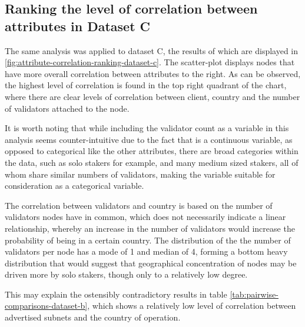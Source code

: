 \documentclass[conference]{IEEEtran}
\begin{document}
\subsection{Ranking the level of correlation between attributes in Dataset C}

The same analysis was applied to dataset C, the results of which are displayed in \ref{fig:attribute-correlation-ranking-dataset-c}.  The scatter-plot displays nodes that have more overall correlation between attributes to the right.  As can be observed, the highest level of correlation is found in the top right quadrant of the chart, where there are clear levels of correlation between client, country and the number of validators attached to the node. %

It is worth noting that while including the validator count as a variable in this analysis seems counter-intuitive due to the fact that is a continuous variable, as opposed to categorical like the other attributes, there are broad categories within the data, such as solo stakers for example, and many medium sized stakers, all of whom share similar numbers of validators, making the variable suitable for consideration as a categorical variable.

The correlation between validators and country is based on the number of validators nodes have in common, which does not necessarily indicate a linear relationship, whereby an increase in the number of validators would increase the probability of being in a certain country.  The distribution of the the number of validators per node has a mode of 1 and median of 4, forming a bottom heavy distribution that would suggest that geographical concentration of nodes may be driven more by solo stakers, though only to a relatively low degree.

This may explain the ostensibly contradictory results in table \ref{tab:pairwise-comparisons-dataset-b}, which shows a relatively low level of correlation between advertised subnets and the country of operation.
\end{document}
